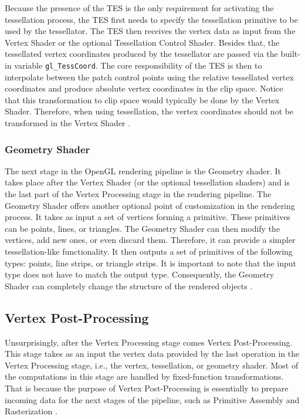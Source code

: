 \documentclass[
  digital,     %
  oneside,     %
  nosansbold,  %
  nocolorbold, %
  lof,         %
  lot,         %
]{fithesis4}
\begin{document}
Because the presence of the TES is the only requirement for activating the tessellation process, the
TES first needs to specify the tessellation primitive to be used by the tessellator. The TES then
receives the vertex data as input from the Vertex Shader or the optional Tessellation Control Shader.
Besides that, the tessellated vertex coordinates produced by the tessellator are passed via the built-in variable \verb|gl_TessCoord|. The core responsibility of the TES is then to interpolate between
the patch control points using the relative tessellated vertex coordinates and produce absolute vertex
coordinates in the clip space. Notice that this transformation to clip space would typically be done by
the Vertex Shader. Therefore, when using tessellation, the vertex coordinates should not be
transformed in the Vertex Shader \cite{learnopengl-tessellation}\cite{openglwiki-tessellation}.

\subsubsection{Geometry Shader}
The next stage in the OpenGL rendering pipeline is the Geometry shader. It takes place after the
Vertex Shader (or the optional tessellation shaders) and is the last part of the Vertex Processing
stage in the rendering pipeline. The Geometry Shader offers another optional point of customization
in the rendering process. It takes as input a set of vertices forming a primitive. These primitives can
be points, lines, or triangles. The Geometry Shader can then modify the vertices, add new ones, or
even discard them. Therefore, it can provide a simpler tessellation-like functionality. It then outputs
a set of primitives of the following types: points, line strips, or triangle strips. It is important to note
that the input type does not have to match the output type. Consequently, the Geometry Shader can
completely change the structure of the rendered objects \cite{learnopengl-geometry}\cite{openglwiki-geometry}.

\subsection{Vertex Post-Processing}
Unsurprisingly, after the Vertex Processing stage comes Vertex Post-Processing. This stage takes as an input
the vertex data provided by the last operation in the Vertex Processing stage, i.e., the vertex, tessellation, or geometry shader.
Most of the computations in this stage are handled by fixed-function transformations. That is because the purpose
of Vertex Post-Processing is essentially to prepare incoming data for the next stages of the pipeline, such as Primitive Assembly
and Rasterization \cite{openglwiki-vertex-post-processing}.
\end{document}
